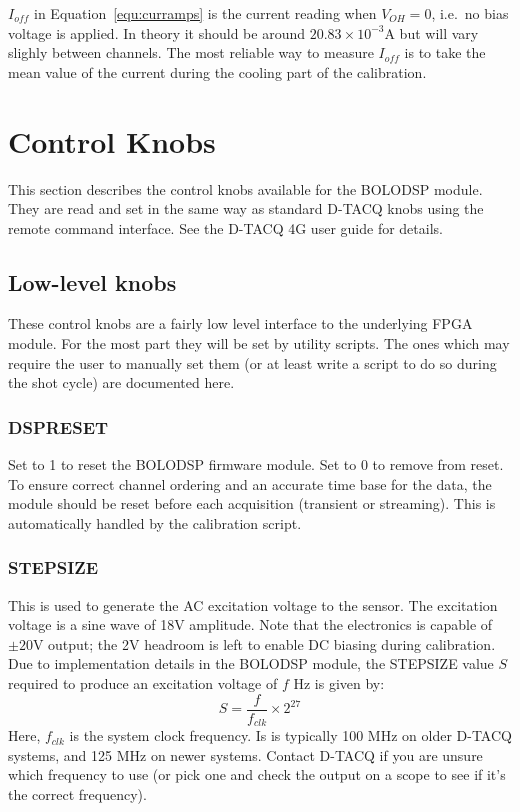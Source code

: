 \documentclass[12pt,a4paper]{article}
\begin{document}
$I_{off}$ in Equation~\ref{equ:curramps} is the current reading when $V_{OH} = 0$, i.e.\ no bias voltage is applied. In theory it should be around
$20.83 \times 10^{-3} \mathrm{A}$ but will vary slighly between channels. The most reliable way to measure $I_{off}$ is to take the mean value of
the current during the cooling part of the calibration.

\section{Control Knobs}
\label{sec:knobs}
This section describes the control knobs available for the BOLODSP module. They are read and set in the same way as standard D-TACQ knobs using the remote
command interface. See the D-TACQ 4G user guide for details.

\subsection{Low-level knobs}
\label{sec:knobsll}
These control knobs are a fairly low level interface to the underlying FPGA module. For the most part they will be set by utility scripts. The ones which
may require the user to manually set them (or at least write a script to do so during the shot cycle) are documented here.

\subsubsection{DSP{\textunderscore}RESET}
Set to 1 to reset the BOLODSP firmware module. Set to 0 to remove from reset. To ensure correct channel ordering and an accurate time base for the data,
the module should be reset before each acquisition (transient or streaming). This is automatically handled by the calibration script.

\subsubsection{STEP{\textunderscore}SIZE}
This is used to generate the AC excitation voltage to the sensor. The excitation voltage is a sine wave of 18V amplitude. Note that the electronics is
capable of $\pm 20\mathrm{V}$ output; the 2V headroom is left to enable DC biasing during calibration. Due to implementation details in the BOLODSP
module, the STEP{\textunderscore}SIZE value $S$ required to produce an excitation voltage of $f$ Hz is given by:
\begin{equation}
  \label{equ:step_size}
  S = \frac{f}{f_{clk}} \times 2^{27}
\end{equation}
Here, $f_{clk}$ is the system clock frequency. Is is typically 100 MHz on older D-TACQ systems, and 125 MHz on newer systems. Contact D-TACQ if you are
unsure which frequency to use (or pick one and check the output on a scope to see if it's the correct frequency).
\end{document}
